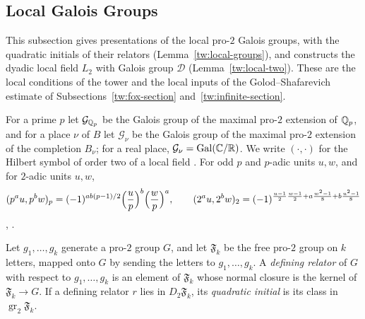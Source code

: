 \subsection{Local Galois Groups}\label{tw:local-section}
This subsection gives presentations of the local pro-$2$ Galois groups, with
the quadratic initials of their relators (Lemma~\ref{tw:local-groups}), and
constructs the dyadic local field $L_2$ with Galois group $\mathcal D$
(Lemma~\ref{tw:local-two}). These are the local conditions of the tower and
the local inputs of the Golod--Shafarevich estimate of
Subsections~\ref{tw:fox-section} and~\ref{tw:infinite-section}.

For a prime $p$ let $\mathcal G_{\mathbb Q_p}$ be the Galois group of the maximal
pro-$2$ extension of $\mathbb Q_p$, and for a place $\nu$ of $B$ let $\mathcal G_\nu$
be the Galois group of the maximal pro-$2$ extension of the completion
$B_\nu$; for a real place, $\mathcal G_\nu=\operatorname{Gal}(\mathbb C/\mathbb R)$. We write
$(\cdot,\cdot)$ for the Hilbert symbol
of order two of a local field \cite[Chapter~III, Section~4]{MilneCFT}. For
odd $p$ and $p$-adic units $u,w$, and for $2$-adic units $u,w$,
\begin{equation}\label{tw:hilbert}
 (p^au,p^bw)_p=(-1)^{ab(p-1)/2}\Bigl(\frac up\Bigr)^b\Bigl(\frac wp\Bigr)^a,
 \qquad
 (2^au,2^bw)_2=(-1)^{\frac{u-1}2\frac{w-1}2+a\frac{w^2-1}8+b\frac{u^2-1}8}
\end{equation}
\cite[Chapter~III, Theorem~1]{SerreCourse}, \cite[Chapter~VIII,
Section~5]{MilneCFT}.

\begin{definition}\label{tw:relator}
Let $g_1,\dots,g_k$ generate a pro-$2$ group $G$, and let $\mathfrak F_k$ be
the free pro-$2$ group on $k$ letters, mapped onto $G$ by sending the letters
to $g_1,\dots,g_k$. A \emph{defining relator} of $G$ with respect to
$g_1,\dots,g_k$ is an element of $\mathfrak F_k$ whose normal closure is the
kernel of $\mathfrak F_k\to G$. If a defining relator $r$ lies in
$D_2\mathfrak F_k$, its \emph{quadratic initial} is its class in
$\operatorname{gr}_2\mathfrak F_k$.
\end{definition}

